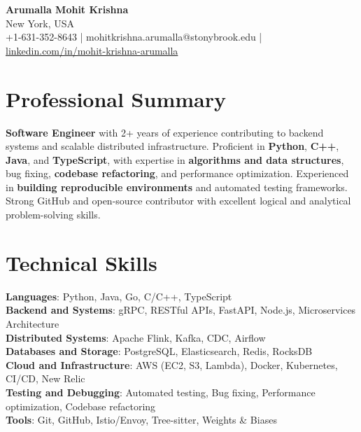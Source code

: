 \documentclass[letterpaper,11pt]{article}
\begin{document}
\begin{center}
  {\Large \textbf{Arumalla Mohit Krishna}} \\
  New York, USA \\
  +1-631-352-8643 \enspace | \enspace mohitkrishna.arumalla@stonybrook.edu \enspace | \enspace \href{https://www.linkedin.com/in/mohit-krishna-arumalla}{linkedin.com/in/mohit-krishna-arumalla}
\end{center}

\section{Professional Summary}
  \begin{itemize}[leftmargin=0.15in, label={}]
    \small{\item{
     \textbf{Software Engineer} with 2+ years of experience contributing to backend systems and scalable distributed infrastructure. Proficient in \textbf{Python}, \textbf{C++}, \textbf{Java}, and \textbf{TypeScript}, with expertise in \textbf{algorithms and data structures}, bug fixing, \textbf{codebase refactoring}, and performance optimization. Experienced in \textbf{building reproducible environments} and automated testing frameworks. Strong GitHub and open-source contributor with excellent logical and analytical problem-solving skills.
    }}
  \end{itemize}
\vspace{-16pt}

\section{Technical Skills}
 \begin{itemize}[leftmargin=0.15in, label={}]
    \small{\item{
     \textbf{Languages}: Python, Java, Go, C/C++, TypeScript \\
     \textbf{Backend and Systems}: gRPC, RESTful APIs, FastAPI, Node.js, Microservices Architecture \\
     \textbf{Distributed Systems}: Apache Flink, Kafka, CDC, Airflow \\
     \textbf{Databases and Storage}: PostgreSQL, Elasticsearch, Redis, RocksDB \\
     \textbf{Cloud and Infrastructure}: AWS (EC2, S3, Lambda), Docker, Kubernetes, CI/CD, New Relic \\
     \textbf{Testing and Debugging}: Automated testing, Bug fixing, Performance optimization, Codebase refactoring \\
     \textbf{Tools}: Git, GitHub, Istio/Envoy, Tree-sitter, Weights \& Biases
    }}
 \end{itemize}
\vspace{-16pt}
\end{document}
